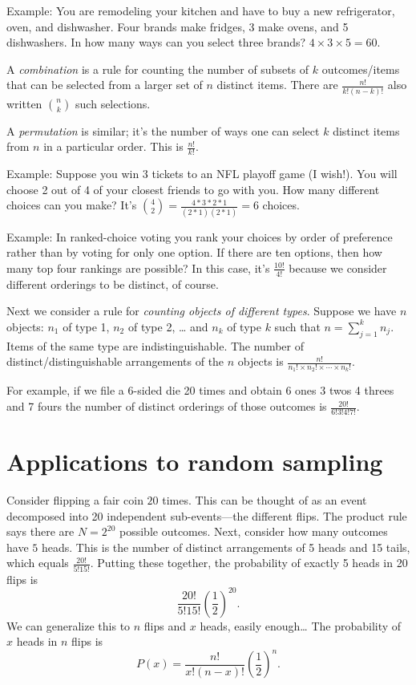 \documentclass[
]{book}
\begin{document}
Example: You are remodeling your kitchen and have to buy a new refrigerator, oven, and dishwasher. Four brands make fridges, 3 make ovens, and 5 dishwashers. In how many ways can you select three brands? \(4\times 3\times 5 = 60\).

A \emph{combination} is a rule for counting the number of subsets of \(k\) outcomes/items that can be selected from a larger set of \(n\) distinct items. There are \(\frac{n!}{k!(n-k)!}\) also written \({n \choose k}\) such selections.

A \emph{permutation} is similar; it's the number of ways one can select \(k\) distinct items from \(n\) in a particular order. This is \(\frac{n!}{k!}\).

Example: Suppose you win 3 tickets to an NFL playoff game (I wish!). You will choose 2 out of 4 of your closest friends to go with you. How many different choices can you make? It's \({4\choose 2} = \frac{4*3*2*1}{(2*1)(2*1) } = 6\) choices.

Example: In ranked-choice voting you rank your choices by order of preference rather than by voting for only one option. If there are ten options, then how many top four rankings are possible? In this case, it's \(\frac{10!}{4!}\) because we consider different orderings to be distinct, of course.

Next we consider a rule for \emph{counting objects of different types}. Suppose we have \(n\) objects: \(n_1\) of type 1, \(n_2\) of type 2, \ldots{} and \(n_k\) of type \(k\) such that \(n=\sum_{j=1}^k n_j\). Items of the same type are indistinguishable. The number of distinct/distinguishable arrangements of the \(n\) objects is \(\frac{n!}{n_1!\times n_2! \times \cdots \times n_k! }\).

For example, if we file a 6-sided die 20 times and obtain 6 ones 3 twos 4 threes and 7 fours the number of distinct orderings of those outcomes is \(\frac{20!}{6!3!4!7!}\).

\hypertarget{applications-to-random-sampling}{%
\section{Applications to random sampling}\label{applications-to-random-sampling}}

Consider flipping a fair coin \(20\) times. This can be thought of as an event decomposed into 20 independent sub-events---the different flips. The product rule says there are \(N = 2^{20}\) possible outcomes. Next, consider how many outcomes have \(5\) heads. This is the number of distinct arrangements of 5 heads and 15 tails, which equals \(\frac{20!}{5!15!}\). Putting these together, the probability of exactly 5 heads in 20 flips is
\[\frac{20!}{5!15!}(\frac{1}{2})^{20}.\]
We can generalize this to \(n\) flips and \(x\) heads, easily enough\ldots{} The probability of \(x\) heads in \(n\) flips is
\[P(x) = \frac{n!}{x!(n-x)!}(\frac{1}{2})^n.\]
\end{document}
